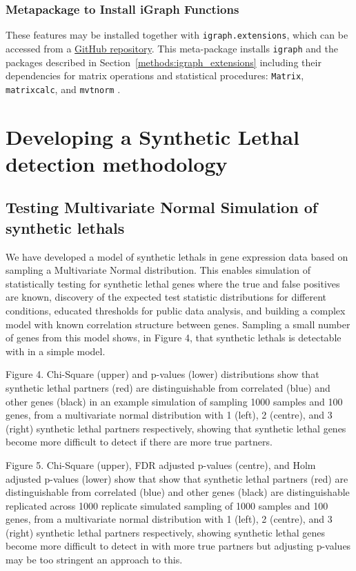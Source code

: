 \subsubsection{Metapackage to Install iGraph Functions}
These features may be installed together with \texttt{igraph.extensions}, which can be accessed from a \href{https://github.com/TomKellyGenetics/igraph.extensions}{GitHub repository}. This meta-package installs \texttt{igraph} \citep{igraph} and the packages described in Section~\ref{methods:igraph_extensions} including their dependencies for matrix operations and statistical procedures: \texttt{Matrix}, \texttt{matrixcalc}, and \texttt{mvtnorm} \citep{Matrix, matrixcalc, Genz2009, mvtnorm}.


\iffalse
\section{Developing a Synthetic Lethal detection methodology}

\subsection{Testing Multivariate Normal Simulation of \Glspl{synthetic lethal}}

We have developed a model of \glspl{synthetic lethal} in \gls{gene expression} data based on sampling a Multivariate Normal distribution.  This enables simulation of statistically testing for \gls{synthetic lethal} genes where the true and false positives are known, discovery of the expected test statistic distributions for different conditions, educated thresholds for public data analysis, and building a complex model with known correlation structure between genes.  Sampling a small number of genes from this model shows, in Figure 4, that \glspl{synthetic lethal} is detectable with in a simple model.

Figure 4.  Chi-Square (upper) and p-values (lower) distributions show that \gls{synthetic lethal} partners (red) are distinguishable from correlated (blue) and other genes (black) in an example simulation of sampling 1000 samples and 100 genes, from a multivariate normal distribution with 1 (left), 2 (centre), and 3 (right) \gls{synthetic lethal} partners respectively, showing that \gls{synthetic lethal} genes become more difficult to detect if there are more true partners.

Figure 5.  Chi-Square (upper), \gls{FDR} adjusted p-values (centre), and Holm adjusted p-values (lower) show that show that \gls{synthetic lethal} partners (red) are distinguishable from correlated (blue) and other genes (black) are distinguishable replicated across 1000 replicate simulated sampling of 1000 samples and 100 genes, from a multivariate normal distribution with 1 (left), 2 (centre), and 3 (right) \gls{synthetic lethal} partners respectively, showing \gls{synthetic lethal} genes become more difficult to detect in with more true partners but adjusting p-values may be too stringent an approach to this.

